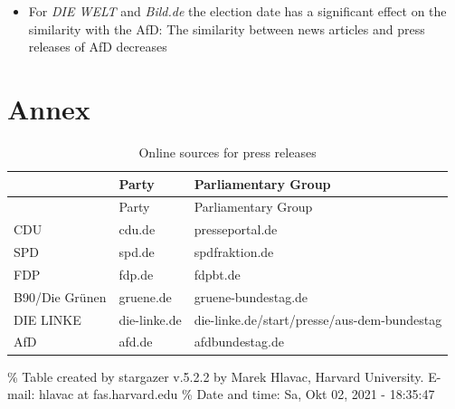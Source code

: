 \documentclass[
]{article}
\providecommand{\tightlist}{%
  \setlength{\itemsep}{0pt}\setlength{\parskip}{0pt}}
\begin{document}
\begin{itemize}
\tightlist
\item
  For \emph{DIE WELT} and \emph{Bild.de} the election date has a
  significant effect on the similarity with the AfD: The similarity
  between news articles and press releases of AfD decreases
\end{itemize}

\newpage

\hypertarget{annex}{%
\section{Annex}\label{annex}}

\begin{longtable}[]{@{}lll@{}}
\caption{Online sources for press releases
\label{table:press_releases_sources}}\tabularnewline
\toprule
& Party & Parliamentary Group \\
\midrule
\endfirsthead
\toprule
& Party & Parliamentary Group \\
\midrule
\endhead
CDU & cdu.de & presseportal.de \\
SPD & spd.de & spdfraktion.de \\
FDP & fdp.de & fdpbt.de \\
B90/Die Grünen & gruene.de & gruene-bundestag.de \\
DIE LINKE & die-linke.de &
die-linke.de/start/presse/aus-dem-bundestag \\
AfD & afd.de & afdbundestag.de \\
\bottomrule
\end{longtable}

\% Table created by stargazer v.5.2.2 by Marek Hlavac, Harvard
University. E-mail: hlavac at fas.harvard.edu \% Date and time: Sa, Okt
02, 2021 - 18:35:47
\end{document}
